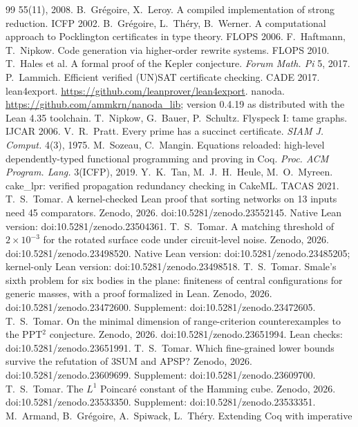 \documentclass[11pt]{article}
\begin{document}
\begin{thebibliography}{99}
  55(11), 2008.
 B.~Gr\'egoire, X.~Leroy. A compiled implementation of strong reduction.
  ICFP 2002.
 B.~Gr\'egoire, L.~Th\'ery, B.~Werner. A computational approach to Pocklington
  certificates in type theory. FLOPS 2006.
 F.~Haftmann, T.~Nipkow. Code generation via higher-order rewrite systems.
  FLOPS 2010.
 T.~Hales et al. A formal proof of the Kepler conjecture. \emph{Forum Math. Pi} 5,
  2017.
 P.~Lammich. Efficient verified (UN)SAT certificate checking. CADE 2017.
 lean4export. \url{https://github.com/leanprover/lean4export}.
 nanoda. \url{https://github.com/ammkrn/nanoda_lib}; version 0.4.19 as distributed
  with the Lean 4.35 toolchain.
 T.~Nipkow, G.~Bauer, P.~Schultz. Flyspeck I: tame graphs. IJCAR 2006.
 V.~R.~Pratt. Every prime has a succinct certificate. \emph{SIAM J. Comput.} 4(3),
  1975.
 M.~Sozeau, C.~Mangin. Equations reloaded: high-level dependently-typed
  functional programming and proving in Coq. \emph{Proc. ACM Program. Lang.} 3(ICFP), 2019.
 Y.~K.~Tan, M.~J.~H.~Heule, M.~O.~Myreen. cake\_lpr: verified propagation
  redundancy checking in CakeML. TACAS 2021.
 T.~S.~Tomar. A kernel-checked Lean proof that sorting networks on 13 inputs need 45
  comparators. Zenodo, 2026. doi:10.5281/zenodo.23552145. Native Lean version:
  doi:10.5281/zenodo.23504361.
 T.~S.~Tomar. A matching threshold of \(2\times10^{-3}\) for the rotated surface code under
  circuit-level noise. Zenodo, 2026. doi:10.5281/zenodo.23498520. Native Lean version:
  doi:10.5281/zenodo.23485205; kernel-only Lean version: doi:10.5281/zenodo.23498518.
 T.~S.~Tomar. Smale's sixth problem for six bodies in the plane: finiteness of central configurations for generic masses, with a proof formalized in Lean. Zenodo, 2026. doi:10.5281/zenodo.23472600. Supplement: doi:10.5281/zenodo.23472605.  T.~S.~Tomar. On the minimal dimension of range-criterion counterexamples to the PPT\(^2\) conjecture. Zenodo, 2026. doi:10.5281/zenodo.23651994. Lean checks: doi:10.5281/zenodo.23651991.  T.~S.~Tomar. Which fine-grained lower bounds survive the refutation of 3SUM and APSP? Zenodo, 2026. doi:10.5281/zenodo.23609699. Supplement: doi:10.5281/zenodo.23609700.  T.~S.~Tomar. The \(L^1\) Poincar\'e constant of the Hamming cube. Zenodo, 2026. doi:10.5281/zenodo.23533350. Supplement: doi:10.5281/zenodo.23533351.
 M.~Armand, B.~Gr\'egoire, A.~Spiwack, L.~Th\'ery. Extending Coq with imperative

\end{thebibliography}
\end{document}
